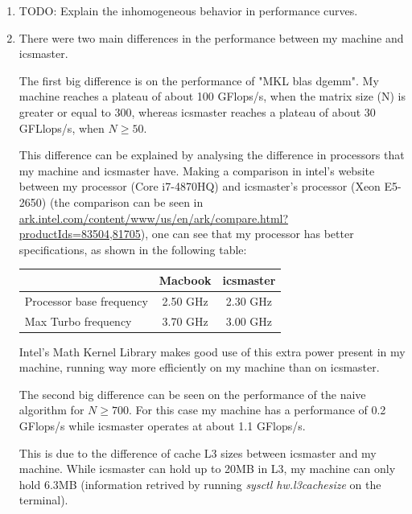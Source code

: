 \documentclass[unicode,11pt,a4paper,oneside,numbers=endperiod,openany]{scrartcl}
\begin{document}
\begin{enumerate}
            
        \item TODO: Explain the inhomogeneous behavior in performance curves.

        \item 
            There were two main differences in the performance between my machine and icsmaster.

            The first big difference is on the performance of "MKL blas dgemm".
            My machine reaches a plateau of about 100 GFlops/s, when the matrix size (N) is greater or equal to 300, whereas icsmaster reaches a plateau of about 30 GFLlops/s, when $N \geq 50$.

            This difference can be explained by analysing the difference in processors that my machine and icsmaster have.
            \sloppy Making a comparison in intel's website between my processor (Core i7-4870HQ) and icsmaster's processor (Xeon E5-2650) (the comparison can be seen in \href{https://ark.intel.com/content/www/us/en/ark/compare.html?productIds=83504,81705}{ark.intel.com/content/www/us/en/ark/compare.html?productIds=83504,81705}), one can see that my processor has better specifications, as shown in the following table:

            \begin{center}
                \begin{tabular}{| l || c | c |}
                        \hline
                    & \textbf{Macbook} & \textbf{icsmaster} \\
                    \hline
                    Processor base frequency & 2.50 GHz  & 2.30 GHz \\ 
                    \hline
                    Max Turbo frequency & 3.70 GHz & 3.00 GHz \\
                    \hline
                \end{tabular}
            \end{center}

            Intel's Math Kernel Library makes good use of this extra power present in my machine, running way more efficiently on my machine than on icsmaster. 


            The second big difference can be seen on the performance of the naive algorithm for $N \geq 700$. For this case my machine has a performance of 0.2 GFlops/s while icsmaster operates at about 1.1 GFlops/s. 

            This is due to the difference of cache L3 sizes between icsmaster and my machine.
            While icsmaster can hold up to 20MB in L3, my machine can only hold 6.3MB (information retrived by running \textit{sysctl hw.l3cachesize} on the terminal). 


\end{enumerate}
\end{document}

